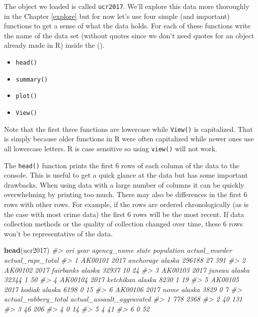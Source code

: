 \documentclass[
  12pt,
]{book}
\newenvironment{Shaded}{\begin{snugshade}}{\end{snugshade}}
\newcommand{\CommentTok}[1]{\textcolor[rgb]{0.37,0.37,0.37}{\textit{#1}}}
\newcommand{\KeywordTok}[1]{\textcolor[rgb]{0.27,0.27,0.27}{\textbf{#1}}}
\newcommand{\NormalTok}[1]{#1}
\providecommand{\tightlist}{%
  \setlength{\itemsep}{0pt}\setlength{\parskip}{0pt}}
\begin{document}
The object we loaded is called \texttt{ucr2017}. We'll explore this data more thoroughly in the Chapter \ref{explore} but for now let's use four simple (and important) functions to get a sense of what the data holds. For each of these functions write the name of the data set (without quotes since we don't need quotes for an object already made in R) inside the ().

\begin{itemize}
\tightlist
\item
  \texttt{head()}
\item
  \texttt{summary()}
\item
  \texttt{plot()}
\item
  \texttt{View()}
\end{itemize}

Note that the first three functions are lowercase while \texttt{View()} is capitalized. That is simply because older functions in R were often capitalized while newer ones use all lowercase letters. R is case sensitive so using \texttt{view()} will not work.

The \texttt{head()} function prints the first 6 rows of each column of the data to the console. This is useful to get a quick glance at the data but has some important drawbacks. When using data with a large number of columns it can be quickly overwhelming by printing too much. There may also be differences in the first 6 rows with other rows. For example, if the rows are ordered chronologically (as is the case with most crime data) the first 6 rows will be the most recent. If data collection methods or the quality of collection changed over time, these 6 rows won't be representative of the data.

\begin{Shaded}
\begin{Highlighting}[]
\KeywordTok{head}\NormalTok{(ucr2017)}
\CommentTok{\#\textgreater{}       ori year agency\_name  state population actual\_murder actual\_rape\_total}
\CommentTok{\#\textgreater{} 1 AK00101 2017   anchorage alaska     296188            27               391}
\CommentTok{\#\textgreater{} 2 AK00102 2017   fairbanks alaska      32937            10                24}
\CommentTok{\#\textgreater{} 3 AK00103 2017      juneau alaska      32344             1                50}
\CommentTok{\#\textgreater{} 4 AK00104 2017   ketchikan alaska       8230             1                19}
\CommentTok{\#\textgreater{} 5 AK00105 2017      kodiak alaska       6198             0                15}
\CommentTok{\#\textgreater{} 6 AK00106 2017        nome alaska       3829             0                 7}
\CommentTok{\#\textgreater{}   actual\_robbery\_total actual\_assault\_aggravated}
\CommentTok{\#\textgreater{} 1                  778                      2368}
\CommentTok{\#\textgreater{} 2                   40                       131}
\CommentTok{\#\textgreater{} 3                   46                       206}
\CommentTok{\#\textgreater{} 4                    0                        14}
\CommentTok{\#\textgreater{} 5                    4                        41}
\CommentTok{\#\textgreater{} 6                    0                        52}
\end{Highlighting}
\end{Shaded}
\end{document}
